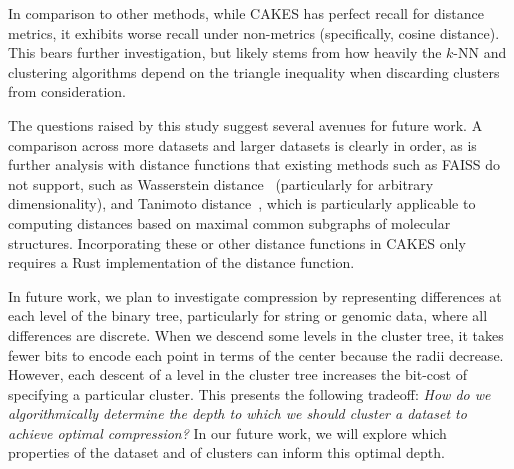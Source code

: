 In comparison to other methods, while CAKES has perfect recall for distance metrics, it exhibits worse recall under non-metrics (specifically, cosine distance). This bears further investigation, but likely stems from how heavily the $k$-NN and clustering algorithms depend on the triangle inequality when discarding clusters from consideration.


The questions raised by this study suggest several avenues for future work.
A comparison across more datasets and larger datasets is clearly in order, as is further analysis with distance functions that existing methods such as FAISS do not support, such as Wasserstein distance~\cite{vallender1974calculation} (particularly for arbitrary dimensionality), and Tanimoto distance~\cite{bajusz2015tanimoto}, which is particularly applicable to computing distances based on maximal common subgraphs of molecular structures.  %
Incorporating these or other distance functions in CAKES only requires a Rust implementation of the distance function.



In future work, we plan to investigate compression by representing differences at each level of the binary tree, particularly for string or genomic data, where all differences are discrete.
When we descend some levels in the cluster tree, it takes fewer bits to encode each point in terms of the center because the radii decrease.
However, each descent of a level in the cluster tree increases the bit-cost of specifying a particular cluster. 
This presents the following tradeoff:
\emph{How do we algorithmically determine the depth to which we should cluster a dataset to achieve optimal compression?} 
In our future work, we will explore which properties of the dataset and of clusters can inform this optimal depth.

